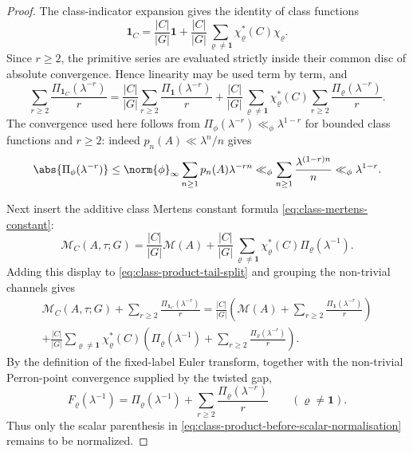 \begin{proof}
  The class-indicator expansion gives the identity of class functions
  \[
    \mathbf1_C
    =
    \frac{|C|}{|G|}\mathbf1
    +
    \frac{|C|}{|G|}
      \sum_{\varrho\neq\mathbf1}\chi_\varrho^\ast(C)\chi_\varrho .
  \]
  Since \(r\ge2\), the primitive series are evaluated strictly inside
  their common disc of absolute convergence. Hence linearity may be used
  term by term, and
  \begin{equation}\label{eq:class-product-tail-split}
    \sum_{r\ge2}\frac{\Pi_{\mathbf1_C}(\lambda^{-r})}{r}
    =
    \frac{|C|}{|G|}\sum_{r\ge2}\frac{\Pi_{\mathbf1}(\lambda^{-r})}{r}
    +
    \frac{|C|}{|G|}
      \sum_{\varrho\neq\mathbf1}\chi_\varrho^\ast(C)
      \sum_{r\ge2}\frac{\Pi_\varrho(\lambda^{-r})}{r}.
  \end{equation}
  The convergence used here follows from
  \(\Pi_\phi(\lambda^{-r})\ll_\phi\lambda^{1-r}\) for bounded class
  functions and \(r\ge2\): indeed \(p_n(A)\ll\lambda^n/n\) gives
  \[
    \abs{\Pi_\phi(\lambda^{-r})}
    \le
    \norm{\phi}_\infty\sum_{n\ge1}p_n(A)\lambda^{-rn}
    \ll_\phi
    \sum_{n\ge1}\frac{\lambda^{(1-r)n}}{n}
    \ll_\phi \lambda^{1-r}.
  \]

  Next insert the additive class Mertens constant formula
  \eqref{eq:class-mertens-constant}:
  \[
    \mathcal M_C(A,\tau;G)
    =
    \frac{|C|}{|G|}\mathcal M(A)
    +
    \frac{|C|}{|G|}
      \sum_{\varrho\neq\mathbf1}
        \chi_\varrho^\ast(C)\Pi_\varrho(\lambda^{-1}).
  \]
  Adding this display to \eqref{eq:class-product-tail-split} and
  grouping the non-trivial channels gives
  \begin{multline}\label{eq:class-product-before-scalar-normalisation}
    \mathcal M_C(A,\tau;G)
    +\sum_{r\ge2}\frac{\Pi_{\mathbf1_C}(\lambda^{-r})}{r}
    =
    \frac{|C|}{|G|}
    \left(
      \mathcal M(A)+\sum_{r\ge2}\frac{\Pi_{\mathbf1}(\lambda^{-r})}{r}
    \right) \\
    +
    \frac{|C|}{|G|}
      \sum_{\varrho\neq\mathbf1}\chi_\varrho^\ast(C)
      \left(
        \Pi_\varrho(\lambda^{-1})
        +\sum_{r\ge2}\frac{\Pi_\varrho(\lambda^{-r})}{r}
      \right).
  \end{multline}
  By the definition of the fixed-label Euler transform, together with the
  non-trivial Perron-point convergence supplied by the twisted gap,
  \[
    F_\varrho(\lambda^{-1})
    =
    \Pi_\varrho(\lambda^{-1})
    +\sum_{r\ge2}\frac{\Pi_\varrho(\lambda^{-r})}{r}
    \qquad(\varrho\neq\mathbf1).
  \]
  Thus only the scalar parenthesis in
  \eqref{eq:class-product-before-scalar-normalisation} remains to be
  normalized.


\end{proof}
